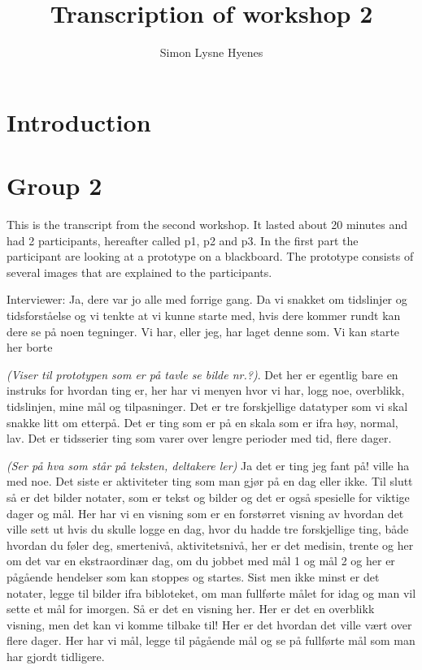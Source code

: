 \documentclass[11pt, norsk, a4paper]{article}
\author{Simon Lysne Hyenes}
\title{Transcription of workshop 2}
\begin{document}
\maketitle{}

\section{Introduction}

\section{Group 2}
This is the transcript from the second workshop. It lasted about 20 minutes and had 2 participants, hereafter called p1, p2 and p3. In the first part the participant are looking at a prototype on a blackboard. The prototype consists of several images that are explained to the participants. 



\textcolor{myBlue} {Interviewer: }Ja, dere var jo alle med forrige gang. Da vi snakket om tidslinjer og tidsforståelse og vi tenkte at vi kunne starte med, hvis dere kommer rundt kan dere se på noen tegninger. Vi har, eller jeg, har laget denne som. Vi kan starte her borte 

\textcolor{myGrey}{\textit{(Viser til prototypen som er på tavle se bilde nr.?)}}. Det her er egentlig bare en instruks for hvordan ting er, her har vi menyen hvor vi har, logg noe, overblikk, tidslinjen, mine mål og tilpasninger. Det er tre forskjellige datatyper som vi skal snakke litt om etterpå. Det er ting som er på en skala som er ifra høy, normal, lav. Det er tidsserier ting som varer over lengre perioder med tid, flere dager. 

\textcolor{myGrey}{\textit{(Ser på hva som står på teksten, deltakere ler)}} Ja det er ting jeg fant på! ville ha med noe. Det siste er aktiviteter ting som man gjør på en dag eller ikke. Til slutt så er det bilder notater, som er tekst og bilder og det er også spesielle for viktige dager og mål. Her har vi en visning som er en forstørret visning av hvordan det ville sett ut hvis du skulle logge en dag, hvor du hadde tre forskjellige ting, både hvordan du føler deg, smertenivå, aktivitetsnivå, her er det medisin, trente og her om det var en ekstraordinær dag, om du jobbet med mål 1 og mål 2 og her er pågående hendelser som kan stoppes og startes. Sist men ikke minst er det notater, legge til bilder ifra bibloteket, om man fullførte målet for idag og man vil sette et mål for imorgen. Så er det en visning her. Her er det en overblikk visning, men det kan vi komme tilbake til! Her er det hvordan det ville vært over flere dager. Her har vi mål, legge til pågående mål og se på fullførte mål som man har gjordt tidligere.
\end{document}
